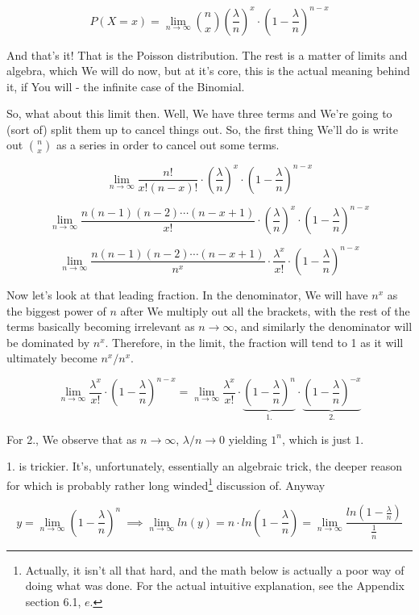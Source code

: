 \documentclass{article}
\begin{document}
		\[P(X = x) =  \lim_{n \to \infty} {n \choose x} \left(\frac{\lambda}{n}\right)^x\cdot  \left(1 - \frac{\lambda}{n}\right)^{n-x} \]
		
		And that's it! That is the Poisson distribution. The rest is a matter of limits and algebra, which We will do now, but at it's core, this is the actual meaning behind it, if You will - the infinite case of the Binomial. 
		
		So, what about this limit then. Well, We have three terms and We're going to (sort of) split them up to cancel things out. So, the first thing We'll do is write out ${n \choose x}$ as a series in order to cancel out some terms.
		
		\[\lim_{n \to \infty} \frac{n!}{x!(n-x)!} \cdot \left(\frac{\lambda}{n}\right)^x\cdot  \left(1 - \frac{\lambda}{n}\right)^{n-x} \]
		
		\[\lim_{n \to \infty} \frac{n(n-1)(n-2)\cdots(n-x+1)}{x!}  \cdot \left(\frac{\lambda}{n}\right)^x\cdot  \left(1 - \frac{\lambda}{n}\right)^{n-x} \]
		
		\[\lim_{n \to \infty} \frac{n(n-1)(n-2)\cdots(n-x+1)}{n^x}  \cdot \frac{\lambda^x}{x!}\cdot  \left(1 - \frac{\lambda}{n}\right)^{n-x} \]
		
		Now let's look at that leading fraction. In the denominator, We will have $n^x$ as the biggest power of $n$ after We multiply out all the brackets, with  the rest of the terms basically becoming irrelevant as $n \to \infty$, and similarly the denominator will be dominated by $n^x$. Therefore, in the limit, the fraction will tend to 1 as it will ultimately become $n^x/n^x$.
		
		\[\lim_{n \to \infty} \frac{\lambda^x}{x!}\cdot  \left(1 - \frac{\lambda}{n}\right)^{n-x} = \lim_{n \to \infty} \frac{\lambda^x}{x!}\cdot  \underbrace{\left(1 - \frac{\lambda}{n}\right)^{n}}_{1.} \cdot \underbrace{\left(1 - \frac{\lambda}{n}\right)^{-x}}_{2.} \]

		For 2., We observe that as $n \to \infty$, $\lambda/n \to 0$ yielding $1^n$, which is just $1$. 
				
		1. is trickier. It's, unfortunately, essentially an algebraic trick, the deeper reason for which is probably rather long winded\footnote{Actually, it isn't all that hard, and the math below is actually a poor way of doing what was done. For the actual intuitive explanation, see the Appendix section 6.1, $e$.} discussion of. Anyway
		
		\[ y = \lim_{n\to\infty} \left(1 - \frac{\lambda}{n}\right)^n\ \implies \lim_{n\to\infty} ln(y) = n\cdot ln\left(1 - \frac{\lambda}{n}\right) = \lim_{n\to\infty}\frac{ln\left(1 - \frac{\lambda}{n}\right)}{\frac{1}{n}} \]
		
\end{document}
